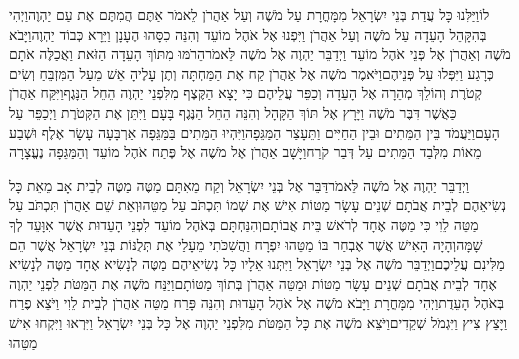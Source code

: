 \documentclass[../main/main.tex]{subfiles}
\begin{document}
\begin{multicols}{\ncols}
לוֹ\PreVerseSpace{}וַיַּלִּנוּ\SubEnd{} כָּל עֲדַת בְּנֵי יִשְׂרָאֵל מִמָּחֳרָת עַל מֹשֶׁה וְעַל אַהֲרֹן לֵאמֹר אַתֶּם הֲמִתֶּם אֶת עַם יַהְוֶה\PreVerseSpace{}וַיְהִי בְּהִקָּהֵל הָעֵדָה עַל מֹשֶׁה וְעַל אַהֲרֹן וַיִּפְנוּ אֶל אֹהֶל מוֹעֵד וְהִנֵּה כִסָּהוּ הֶעָנָן וַיֵּרָא כְּבוֹד יַהְוֶה\PreVerseSpace{}וַיָּבֹא מֹשֶׁה וְאַהֲרֹן אֶל פְּנֵי אֹהֶל מוֹעֵד \ClosedSection{}וַיְדַבֵּר יַהְוֶה אֶל מֹשֶׁה לֵּאמֹר\PreVerseSpace{}הֵרֹמּוּ מִתּוֹךְ הָעֵדָה הַזֹּאת וַאֲכַלֶּה אֹתָם כְּרָגַע וַיִּפְּלוּ עַל פְּנֵיהֶם\PreVerseSpace{}וַיֹּאמֶר מֹשֶׁה אֶל אַהֲרֹן קַח אֶת הַמַּחְתָּה וְתֶן עָלֶיהָ אֵשׁ מֵעַל הַמִּזְבֵּחַ וְשִׂים קְטֹרֶת וְהוֹלֵךְ מְהֵרָה אֶל הָעֵדָה וְכַפֵּר עֲלֵיהֶם כִּי יָצָא הַקֶּצֶף מִלִּפְנֵי יַהְוֶה הֵחֵל הַנָּגֶף\PreVerseSpace{}וַיִּקַּח אַהֲרֹן כַּאֲשֶׁר דִּבֶּר מֹשֶׁה וַיָּרָץ אֶל תּוֹךְ הַקָּהָל וְהִנֵּה הֵחֵל הַנֶּגֶף בָּעָם וַיִּתֵּן אֶת הַקְּטֹרֶת וַיְכַפֵּר עַל הָעָם\PreVerseSpace{}וַיַּעֲמֹד בֵּין הַמֵּתִים וּבֵין הַחַיִּים וַתֵּעָצַר הַמַּגֵּפָה\PreVerseSpace{}וַיִּהְיוּ הַמֵּתִים בַּמַּגֵּפָה אַרְבָּעָה עָשָׂר אֶלֶף וּשְׁבַע מֵאוֹת מִלְּבַד הַמֵּתִים עַל דְּבַר קֹרַח\PreVerseSpace{}וַיָּשָׁב אַהֲרֹן אֶל מֹשֶׁה אֶל פֶּתַח אֹהֶל מוֹעֵד וְהַמַּגֵּפָה נֶעֱצָרָה\OpenSection{}\par
{}וַיְדַבֵּר יַהְוֶה אֶל מֹשֶׁה לֵּאמֹר\PreVerseSpace{}דַּבֵּר אֶל בְּנֵי יִשְׂרָאֵל וְקַח מֵאִתָּם מַטֶּה מַטֶּה לְבֵית אָב מֵאֵת כָּל נְשִׂיאֵהֶם לְבֵית אֲבֹתָם שְׁנֵים עָשָׂר מַטּוֹת אִישׁ אֶת שְׁמוֹ תִּכְתֹּב עַל מַטֵּהוּ\PreVerseSpace{}וְאֵת שֵׁם אַהֲרֹן תִּכְתֹּב עַל מַטֵּה לֵוִי כִּי מַטֶּה אֶחָד לְרֹאשׁ בֵּית אֲבוֹתָם\PreVerseSpace{}וְהִנַּחְתָּם בְּאֹהֶל מוֹעֵד לִפְנֵי הָעֵדוּת אֲשֶׁר אִוָּעֵד לְךָ\SubEnd{} שָׁמָּה\PreVerseSpace{}וְהָיָה הָאִישׁ אֲשֶׁר אֶבְחַר בּוֹ מַטֵּהוּ יִפְרָח וַהֲשִׁכֹּתִי מֵעָלַי אֶת תְּלֻנּוֹת בְּנֵי יִשְׂרָאֵל אֲשֶׁר הֵם מַלִּינִם עֲלֵיכֶם\PreVerseSpace{}וַיְדַבֵּר מֹשֶׁה אֶל בְּנֵי יִשְׂרָאֵל וַיִּתְּנוּ אֵלָיו כָּל נְשִׂיאֵיהֶם מַטֶּה לְנָשִׂיא אֶחָד מַטֶּה לְנָשִׂיא אֶחָד לְבֵית אֲבֹתָם שְׁנֵים עָשָׂר מַטּוֹת וּמַטֵּה אַהֲרֹן בְּתוֹךְ מַטּוֹתָם\PreVerseSpace{}וַיַּנַּח מֹשֶׁה אֶת הַמַּטֹּת לִפְנֵי יַהְוֶה בְּאֹהֶל הָעֵדֻת\PreVerseSpace{}וַיְהִי מִמָּחֳרָת וַיָּבֹא מֹשֶׁה אֶל אֹהֶל הָעֵדוּת וְהִנֵּה פָּרַח מַטֵּה אַהֲרֹן לְבֵית לֵוִי וַיֹּצֵא פֶרַח וַיָּצֵץ צִיץ וַיִּגְמֹל שְׁקֵדִים\PreVerseSpace{}וַיֹּצֵא מֹשֶׁה אֶת כָּל הַמַּטֹּת מִלִּפְנֵי יַהְוֶה אֶל כָּל בְּנֵי יִשְׂרָאֵל וַיִּרְאוּ וַיִּקְחוּ אִישׁ מַטֵּהוּ\OpenSection{}\par

\end{multicols}
\end{document}
